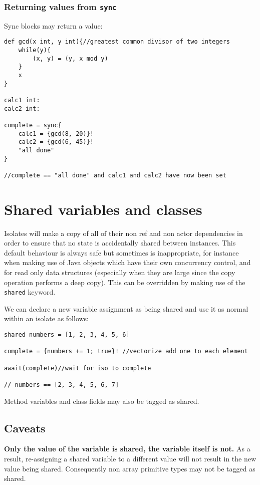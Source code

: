 \documentclass[conc-doc]{subfiles}
\begin{document}
\subsubsection{Returning values from \lstinline{sync}}
Sync blocks may return a value:

\begin{lstlisting}
def gcd(x int, y int){//greatest common divisor of two integers
	while(y){
		(x, y) = (y, x mod y)
	}
	x
}

calc1 int:
calc2 int:

complete = sync{
	calc1 = {gcd(8, 20)}!
	calc2 = {gcd(6, 45)}!
	"all done"
}

//complete == "all done" and calc1 and calc2 have now been set
\end{lstlisting}

\section{Shared variables and classes}
\label{sec:shared}
Isolates will make a copy of all of their non ref and non actor dependencies in order to ensure that no state is accidentally shared between instances. This default behaviour is always safe but sometimes is inappropriate, for instance when making use of Java objects which have their own concurrency control, and for read only data structures (especially when they are large since the copy operation performs a deep copy). This can be overridden by making use of the \lstinline{shared} keyword.

We can declare a new variable assignment as being shared and use it as normal within an isolate as follows:
\begin{lstlisting}
shared numbers = [1, 2, 3, 4, 5, 6]

complete = {numbers += 1; true}! //vectorize add one to each element

await(complete)//wait for iso to complete

// numbers == [2, 3, 4, 5, 6, 7]
\end{lstlisting}

Method variables and class fields may also be tagged as shared.

\subsection{Caveats}
\textbf{Only the value of the variable is shared, the variable itself is not.} As a result, re-assigning a shared variable to a different value will not result in the new value being shared. Consequently non array primitive types may not be tagged as shared.
\end{document}
